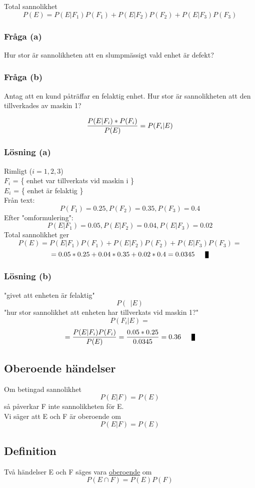 \documentclass{article}
\begin{document}
Total sannolikhet
$$ P(E) = P(E|F_1)P(F_1) + P(E|F_2)P(F_2) + P(E|F_3)P(F_3)$$
\subsubsection{Fråga (a)}
Hur stor är sannolikheten att en slumpmässigt vald enhet är defekt?

\subsubsection{Fråga (b)}
Antag att en kund påträffar en felaktig enhet. Hur stor är sannolikheten att den tillverkades av maskin 1?

$$ \frac{P(E|F_i)*P(F_i)}{P(E)} = P(F_i|E) $$

\subsubsection{Lösning (a)}
Rimligt ($i=1,2,3$)\\
$F_i$ = \{ enhet var tillverkats vid maskin i \}\\
$E_i$ = \{ enhet är felaktig \}\\
Från text:
$$ P(F_1)=0.25, P(F_2)=0.35, P(F_3)=0.4 $$
Efter "omformulering":
$$ P(E|F_1) = 0.05, P(E|F_2) = 0.04, P(E|F_3) = 0.02 $$
Total sannolikhet ger
$$ P(E) = P(E|F_1)P(F_1) + P(E|F_2)P(F_2) +P(E|F_3)P(F_3) = $$
$$ = 0.05*0.25+0.04*0.35+0.02*0.4=0.0345 \qed $$

\subsubsection{Lösning (b)}
"givet att enheten är felaktig"
$$ P(\ \ |E) $$
"hur stor sannolikhet att enheten har tillverkats vid maskin 1?"
$$ P(F_i|E) =$$
$$= \f{P(E|F_i)P(F_i)}{P(E)} = \f{0.05*0.25}{0.0345} = 0.36 \qed $$

\subsection{Oberoende händelser}
Om betingad sannolikhet
$$ P(E|F) = P(E) $$
så påverkar F inte sannolikheten för E.\\
Vi säger att E och F är oberoende om
$$ P(E|F) = P(E) $$
\subsection{Definition}
Två händelser E och F säges vara \underline{oberoende} om
$$ P(E\cap F) = P(E)P(F) $$
\end{document}
